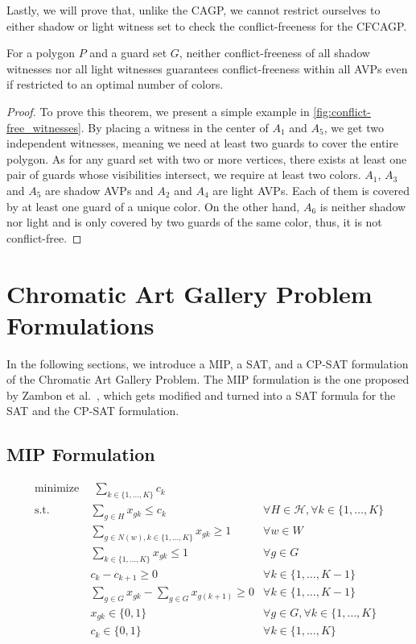 Lastly, we will prove that, unlike the CAGP, we cannot restrict ourselves to either shadow or light witness set to check the conflict-freeness for the CFCAGP.

\begin{theorem}\label{thm:conflict-free_witnesses}
For a polygon $P$ and a guard set $G$, neither conflict-freeness of all shadow witnesses nor all light witnesses guarantees conflict-freeness within all AVPs even if restricted to an optimal number of colors.
\end{theorem}
\begin{proof}
To prove this theorem, we present a simple example in \cref{fig:conflict-free_witnesses}. By placing a witness in the center of $A_{1}$ and $A_{5}$, we get two independent witnesses, meaning we need at least two guards to cover the entire polygon. As for any guard set with two or more vertices, there exists at least one pair of guards whose visibilities intersect, we require at least two colors. $A_{1}$, $A_{3}$ and $A_{5}$ are shadow AVPs and $A_{2}$ and $A_{4}$ are light AVPs. Each of them is covered by at least one guard of a unique color. On the other hand, $A_{6}$ is neither shadow nor light and is only covered by two guards of the same color, thus, it is not conflict-free.
\end{proof}

\chapter{Chromatic Art Gallery Problem Formulations}

In the following sections, we introduce a MIP, a SAT, and a CP-SAT formulation of the Chromatic Art Gallery Problem. The MIP formulation is the one proposed by Zambon et al.~\cite{zambon2014exact}, which gets modified and turned into a SAT formula for the SAT and the CP-SAT formulation.

\section{MIP Formulation}

\begin{align}
\label{eq_MIP:f.0} \mbox{minimize}~& \;\sum_{k\in \{1,\ldots,K\}} c_{k}& \\
\label{eq_MIP:f.1} \mbox{s.t. } &\sum_{g \in H}x_{gk} \leq c_{k} & \forall H \in \mathcal{H}, \forall k\in \{1,\ldots,K\}\\
\label{eq_MIP:f.2}&\sum_{g\in N(w), k\in \{1,\ldots,K\}}x_{gk}\geq 1 & \forall w\in W\\
\label{eq_MIP:f.3}&\sum_{k\in \{1,\ldots,K\}}x_{gk}\leq1 & \forall g\in G\\
\label{eq_MIP:f.4}&c_{k} - c_{k+1} \geq 0 & \forall k\in \{1,\ldots,K-1\}\\
\label{eq_MIP:f.5}&\sum_{g\in G}x_{gk} - \sum_{g\in G}x_{g(k+1)} \geq 0 & \forall k\in \{1,\ldots,K-1\}\\
\label{eq_MIP:f.6}& x_{gk} \in \{0,1\} & \forall g\in G, \forall k\in \{1,\ldots,K\}\\
\label{eq_MIP:f.7}& c_{k}\in \{0,1\} & \forall k\in \{1,\ldots,K\}
\end{align}

